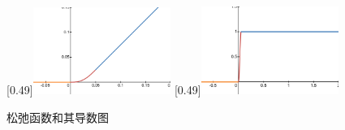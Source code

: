 \documentclass[master,academic]{ysuthesis} %
\begin{document}
		\begin{figure}[!ht]
			\centering
			[0.49\textwidth]{\includegraphics[width=0.4\textwidth]{松弛函数.png}}
			[0.49\textwidth]{\includegraphics[width=0.4\textwidth]{松弛导数.png}}
			\caption{松弛函数和其导数图}
			\label{fig:松弛函数图}
		\end{figure}
\end{document}
